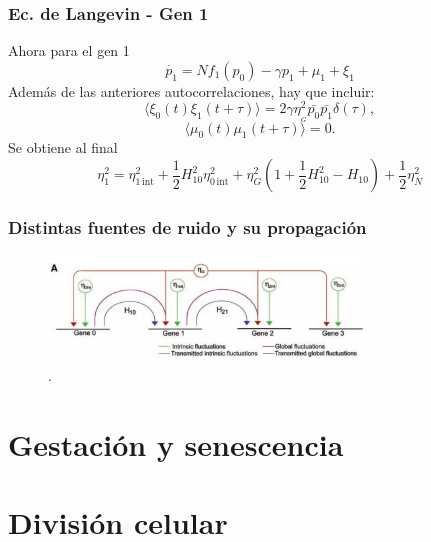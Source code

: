 \documentclass[xcolor=dvipsnames]{beamer}
\begin{document}
\begin{frame}
\frametitle{Ec. de Langevin - Gen 1}
Ahora para el gen 1
$$\dot{p_1} = Nf_1(p_{0}) - \gamma p_1 + \mu_1 + \xi_1$$
Adem\'as de las anteriores autocorrelaciones, hay que incluir:
$$\langle \xi_0(t)\xi_1(t+\tau) \rangle = 2 \gamma \eta_{_G}^2\bar{p_0}\bar{p_1}\delta(\tau),$$
$$\langle \mu_0(t)\mu_1(t+\tau) \rangle =0.$$
Se obtiene al final
$$\eta_1^2 = \eta_{1\,\text{int}}^2 + \frac{1}{2} H_{10}^2 \eta_{0\,\text{int}}^2 + \eta_G^2\left( 1 + \frac{1}{2} H_{10}^2 - H_{10} \right) + \frac{1}{2} \eta_N^2 $$
\end{frame}

\begin{frame}
\frametitle{Distintas fuentes de ruido y su propagaci\'on}
\begin{figure}[p]
    \centering
    \includegraphics[width=0.75\textwidth]{globalint.png}\\
    \tiny \cite{pedraza05}.
\end{figure}
\end{frame}


\section{Gestaci\'on y senescencia}
\section{Divisi\'on celular}
\end{document}
